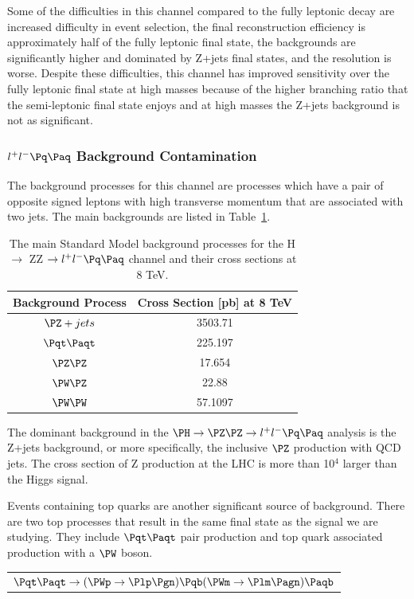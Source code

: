 Some of the difficulties in this channel compared to the fully leptonic decay are increased difficulty in event selection, the final reconstruction efficiency is approximately half of the fully leptonic final state, the backgrounds are significantly higher and dominated by Z+jets final states, and the resolution is worse.  Despite these difficulties, this channel has improved sensitivity over the fully leptonic final state at high masses because of the higher branching ratio that the semi-leptonic final state enjoys and at high masses the Z+jets background is not as significant.



\subsubsection{$l^{+}l^{-} \Pq \Paq$ Background Contamination}

The background processes for this channel are processes which have a pair of opposite signed leptons with high transverse momentum that are associated with two jets.  The main backgrounds are listed in Table~\ref{tab:background_2l2q}.

\begin{table}[htb]
\caption{%
  The main Standard Model background processes for the H $\rightarrow$ ZZ $\rightarrow l^{+}l^{-} \Pq \Paq$ channel and their cross sections at 8 TeV.
}
\begin{center}
  \begin{tabular}{ | c | c |} \hline
    Background Process & Cross Section [pb] at 8 TeV\\ \hline \hline
    $\PZ + jets$ & 3503.71 \\ \hline
    $\Pqt \Paqt$ & 225.197\\ \hline
    $\PZ \PZ$    & 17.654 \\ \hline
    $\PW \PZ$    & 22.88 \\ \hline
    $\PW \PW$    & 57.1097\\ \hline
  \end{tabular}
\end{center}
\label{tab:background_2l2q}
\end{table}

The dominant background in the  $\PH \rightarrow \PZ\PZ \rightarrow l^{+}l^{-} \Pq \Paq$ analysis is the Z+jets background, or more specifically, the inclusive $\PZ$ production with QCD jets.  The cross section of Z production at the LHC is more than 10$^{4}$ larger than the Higgs signal.

Events containing top quarks are another significant source of background.  There are two top processes that result in the same final state as the signal we are studying.  They include $\Pqt \Paqt$ pair production and top quark associated production with a $\PW$ boson.
\begin{center}
  \begin{tabular}{ c }
    $\Pqt \Paqt  \rightarrow (\PWp \rightarrow \Plp\Pgn)\Pqb (\PWm \rightarrow \Plm\Pagn)\Paqb           $
  \end{tabular}
\end{center}
